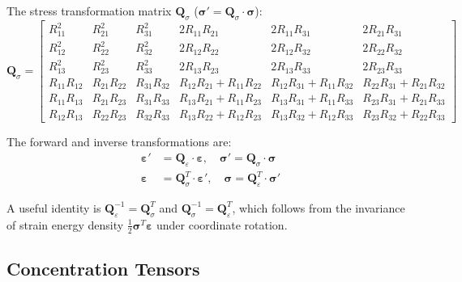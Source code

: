 \documentclass[oneside, 12pt, a4paper, bibliography=totoc]{book}
\newcommand{\bs}[1]{\bm{#1}}                       %
\begin{document}
The stress transformation matrix $\bs{Q}_\sigma$ ($\bs{\sigma}' = \bs{Q}_\sigma \cdot \bs{\sigma}$):
%
\begin{equation}
    \bs{Q}_\sigma =
    \begin{bmatrix}
        R_{11}^2 & R_{21}^2 & R_{31}^2 & 2R_{11}R_{21} & 2R_{11}R_{31} & 2R_{21}R_{31} \\
        R_{12}^2 & R_{22}^2 & R_{32}^2 & 2R_{12}R_{22} & 2R_{12}R_{32} & 2R_{22}R_{32} \\
        R_{13}^2 & R_{23}^2 & R_{33}^2 & 2R_{13}R_{23} & 2R_{13}R_{33} & 2R_{23}R_{33} \\
        R_{11}R_{12} & R_{21}R_{22} & R_{31}R_{32} & R_{12}R_{21}+R_{11}R_{22} & R_{12}R_{31}+R_{11}R_{32} & R_{22}R_{31}+R_{21}R_{32} \\
        R_{11}R_{13} & R_{21}R_{23} & R_{31}R_{33} & R_{13}R_{21}+R_{11}R_{23} & R_{13}R_{31}+R_{11}R_{33} & R_{23}R_{31}+R_{21}R_{33} \\
        R_{12}R_{13} & R_{22}R_{23} & R_{32}R_{33} & R_{13}R_{22}+R_{12}R_{23} & R_{13}R_{32}+R_{12}R_{33} & R_{23}R_{32}+R_{22}R_{33}
    \end{bmatrix}
    \label{eq:Q_sigma}
\end{equation}

The forward and inverse transformations are:
%
\begin{align}
    \bs{\varepsilon}' &= \bs{Q}_\varepsilon \cdot \bs{\varepsilon}, \quad \bs{\sigma}' = \bs{Q}_\sigma \cdot \bs{\sigma} \label{eq:transform_forward}\\
    \bs{\varepsilon} &= \bs{Q}_\sigma^T \cdot \bs{\varepsilon}', \quad \bs{\sigma} = \bs{Q}_\varepsilon^T \cdot \bs{\sigma}' \label{eq:transform_inverse}
\end{align}

A useful identity is $\bs{Q}_\varepsilon^{-1} = \bs{Q}_\sigma^T$ and $\bs{Q}_\sigma^{-1} = \bs{Q}_\varepsilon^T$, which follows from the invariance of strain energy density $\frac{1}{2}\bs{\sigma}^T \bs{\varepsilon}$ under coordinate rotation.

\subsection{Concentration Tensors}
\label{sec:concentration_tensors_theory}
\end{document}
